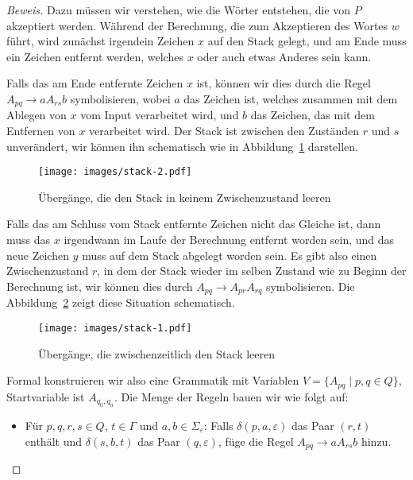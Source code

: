 \begin{proof}[Beweis]
Dazu müssen wir verstehen, wie die Wörter entstehen, die von $P$
akzeptiert werden. Während der Berechnung, die zum Akzeptieren des
Wortes $w$ führt, wird zunächst
irgendein Zeichen $x$ auf den Stack gelegt, und am Ende muss ein
Zeichen entfernt werden, welches $x$ oder auch etwas Anderes sein kann.

Falls das am Ende entfernte Zeichen $x$ ist, können wir dies durch
die Regel $A_{pq}\to aA_{rs}b$ symbolisieren, wobei $a$ das Zeichen
ist, welches zusammen mit dem Ablegen von $x$ vom Input verarbeitet wird,
und $b$ das Zeichen, das mit dem Entfernen von $x$ verarbeitet wird.
Der Stack ist zwischen den Zuständen $r$ und $s$ unverändert, wir
können ihn schematisch wie in Abbildung~\ref{stacknichtleer} darstellen.
\begin{figure}
\begin{center}
\texttt{[image: images/stack-2.pdf]}
\end{center}
\caption{Übergänge, die den Stack in keinem Zwischenzustand leeren\label{stacknichtleer}}
\end{figure}

Falls das am Schluss vom Stack entfernte Zeichen nicht das Gleiche ist,
dann muss das $x$ irgendwann im Laufe der Berechnung entfernt worden
sein, und das neue Zeichen $y$ muss auf dem Stack abgelegt worden
sein. Es gibt also einen Zwischenzustand $r$, in dem der Stack
wieder im selben Zustand wie zu
Beginn der Berechnung ist, wir können dies durch
$A_{pq}\to A_{pr}A_{rq}$ symbolisieren.
Die Abbildung~\ref{stackleer} zeigt diese Situation schematisch.
\begin{figure}
\begin{center}
\texttt{[image: images/stack-1.pdf]}
\end{center}
\caption{Übergänge, die zwischenzeitlich den Stack leeren\label{stackleer}}
\end{figure}

Formal konstruieren wir also eine Grammatik mit Variablen
$V=\{A_{pq}\;|\; p,q\in Q\}$, Startvariable ist $A_{q_0,q_a}$.
Die Menge der Regeln bauen wir wie folgt auf:
\begin{itemize}
\item Für $p,q,r,s\in Q$, $t\in\Gamma$ und $a,b\in\Sigma_{\varepsilon}$:
Falls $\delta(p,a,\varepsilon)$ das Paar $(r,t)$ enthält
und $\delta(s,b,t)$ das Paar $(q,\varepsilon)$, füge die Regel
$A_{pq}\to aA_{rs}b$ hinzu.


\end{itemize}
\end{proof}
